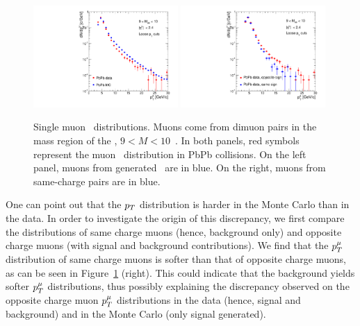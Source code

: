 \begin{figure}[h]
\begin{centering}  
  \includegraphics[width=0.49\textwidth]{Chapters/aCorrection/pt_aa_MC.pdf}
  \includegraphics[width=0.49\textwidth]{Chapters/aCorrection/pt_aa_samesign.pdf}
  \caption{Single muon \pt\ distributions. Muons come from dimuon
    pairs in the mass region of the \PgU, $9 < M < 10$~\unitMass. In
    both panels, red symbols represent the muon \pt\ distribution in
    PbPb collisions. On the left panel, muons from generated \PgU\ are in
    blue. On the right, muons from same-charge pairs are in blue.
  }
  \label{fig:pt_mcdata}
\end{centering}  
\end{figure}

One can point out that the $p_{T}$ distribution is harder in the Monte Carlo
than in the data. In order to investigate the origin of this
discrepancy, we first compare the distributions of same charge muons
(hence, background only) and opposite charge muons (with signal and
background contributions). We find that the $p_{T}^\mu$ distribution of
same charge muons is softer than that of opposite charge muons, as can
be seen in Figure~\ref{fig:pt_mcdata} (right). This could indicate that
the background yields softer $p_{T}^\mu$ distributions, thus possibly
explaining the discrepancy observed on the opposite charge muon
$p_{T}^\mu$ distributions in the data (hence, signal and background) and
in the Monte Carlo (only signal generated). 

